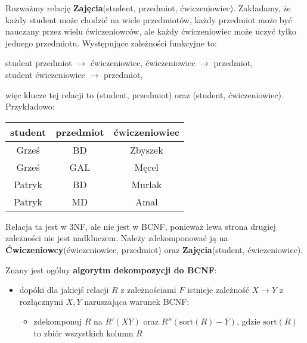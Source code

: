 \begin{example}
Rozważmy relację \textbf{Zajęcia}(student, przedmiot, ćwiczeniowiec). Zakładamy, że każdy student może chodzić na wiele przedmiotów, każdy przedmiot może być nauczany przez wielu ćwiczeniowców, ale każdy ćwiczeniowiec może uczyć tylko jednego przedmiotu. Występujące zależności funkcyjne to:
\begin{center}
    student przedmiot $\to$ ćwiczeniowiec,
    \qquad ćwiczeniowiec $\to$ przedmiot, \\ student ćwiczeniowiec $\to$ przedmiot,
\end{center}
więc klucze tej relacji to (student, przedmiot) oraz (student, ćwiczeniowiec). Przykładowo:

\begin{center}
    \begin{tabular}{c|c|c}
     student & przedmiot & ćwiczeniowiec \\
     \hline
     Grześ & BD & Zbyszek \\
     Grześ & GAL & Męcel \\
     Patryk & BD & Murlak \\
     Patryk & MD & Amal \\
    \end{tabular}
\end{center}

Relacja ta jest w 3NF, ale nie jest w BCNF, ponieważ lewa strona drugiej zależności nie jest nadkluczem. Należy zdekomponować ją na \textbf{Ćwiczeniowcy}(ćwiczeniowiec, przedmiot) oraz \textbf{Zajęcia}(student, ćwiczeniowiec).
\end{example}

Znany jest ogólny \textbf{algorytm dekompozycji do BCNF}:
\begin{itemize}
    \item dopóki dla jakiejś relacji $R$ z zależnościami $F$ istnieje zależność $X \to Y$ z rozłącznymi $X, Y$ naruszająca warunek BCNF:
    \begin{itemize}
        \item zdekomponuj $R$ na $R'(XY)$ oraz $R''(\mathrm{sort}(R) - Y)$, gdzie $\mathrm{sort}(R)$ to zbiór wszystkich kolumn $R$
    \end{itemize}
\end{itemize}

